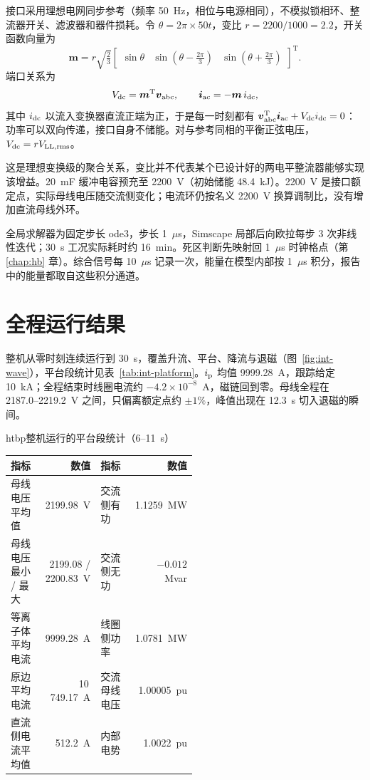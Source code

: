 接口采用理想电网同步参考（频率 50~Hz，相位与电源相同），不模拟锁相环、整流器开关、滤波器和器件损耗。令 $\theta=2\pi\times50t$，变比 $r=2200/1000=2.2$，开关函数向量为
\begin{equation}
\boldsymbol m=r\sqrt{\tfrac23}\begin{bmatrix}\sin\theta&\sin(\theta-\tfrac{2\pi}{3})&\sin(\theta+\tfrac{2\pi}{3})\end{bmatrix}^{\mathrm T}.
\end{equation}
端口关系为
\begin{equation}
V_{\mathrm{dc}}=\boldsymbol m^{\mathrm T}\boldsymbol v_{\mathrm{abc}},\qquad \boldsymbol i_{\mathrm{ac}}=-\boldsymbol m\,i_{\mathrm{dc}},
\label{eq:acdc}
\end{equation}
其中 $i_{\mathrm{dc}}$ 以流入变换器直流正端为正，于是每一时刻都有 $\boldsymbol v_{\mathrm{abc}}^{\mathrm T}\boldsymbol i_{\mathrm{ac}}+V_{\mathrm{dc}}i_{\mathrm{dc}}=0$：功率可以双向传递，接口自身不储能。对与参考同相的平衡正弦电压，$V_{\mathrm{dc}}=rV_{\mathrm{LL,rms}}$。

这是理想变换级的聚合关系，变比并不代表某个已设计好的两电平整流器能够实现该增益。20~mF 缓冲电容预充至 2200~V（初始储能 48.4~kJ）。2200~V 是接口额定点，实际母线电压随交流侧变化；电流环仍按名义 2200~V 换算调制比，没有增加直流母线外环。

全局求解器为固定步长 ode3，步长 1~$\mu$s，Simscape 局部后向欧拉每步 3 次非线性迭代；30~s 工况实际耗时约 16~min。死区判断先映射回 1~$\mu$s 时钟格点（第 \ref{chap:hb} 章）。综合信号每 10~$\mu$s 记录一次，能量在模型内部按 1~$\mu$s 积分，报告中的能量都取自这些积分通道。

\section{全程运行结果}

整机从零时刻连续运行到 30~s，覆盖升流、平台、降流与退磁（图~\ref{fig:int-wave}），平台段统计见表~\ref{tab:int-platform}。$i_{\mathrm{p}}$ 均值 9999.28~A，跟踪给定 10~kA；全程结束时线圈电流约 $-4.2\times10^{-8}$~A，磁链回到零。母线全程在 2187.0--2219.2~V 之间，只偏离额定点约 $\pm1\%$，峰值出现在 12.3~s 切入退磁的瞬间。


\begin{dtable}{htbp}{整机运行的平台段统计（6--11~s）}
\label{tab:int-platform}
\begin{tabularx}{\linewidth}{P{0.26\linewidth}RP{0.26\linewidth}R}
\toprule
\headrow 指标 & 数值 & 指标 & 数值 \\
\midrule
母线电压平均值 & 2199.98~V & 交流侧有功 & 1.1259~MW \\
母线电压最小 / 最大 & 2199.08 / 2200.83~V & 交流侧无功 & $-0.012$~Mvar \\
等离子体平均电流 & 9999.28~A & 线圈侧功率 & 1.0781~MW \\
原边平均电流 & 10\,749.17~A & 交流母线电压 & 1.00005~pu \\
直流侧电流平均值 & 512.2~A & 内部电势 & 1.0022~pu \\
\bottomrule
\end{tabularx}
\end{dtable}

